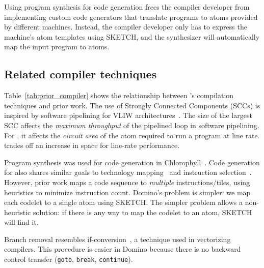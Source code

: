 Using program synthesis for code generation frees the compiler developer from implementing
custom code generators that translate \pktlanguage programs to atoms 
provided by different \absmachine machines.
Instead, the
compiler developer only has to express the \absmachine machine's
atom templates using SKETCH, and the synthesizer will automatically map 
the input \pktlanguage program to atoms.


\subsection{Related compiler techniques}
\label{ss:related_compiler}
Table~\ref{tab:prior_compiler} shows the relationship between \pktlanguage's
compilation techniques and prior work. The use of Strongly Connected Components
(SCCs) is inspired by software pipelining for VLIW
architectures~\cite{software_pipelining}. The size of the largest SCC affects
the {\em maximum throughput} of the pipelined loop in software pipelining. For
\pktlanguage, it affects the {\em circuit area} of the atom required to run a
program at line rate. \pktlanguage trades off an increase in space for
line-rate performance.

Program synthesis was used for code generation in
Chlorophyll~\cite{chlorophyll}.  Code generation for \pktlanguage also shares
similar goals to technology mapping~\cite{micheli} and
instruction selection~\cite{muchnik}.  However, prior work maps a code sequence
to \textit{multiple} instructions/tiles, using heuristics to minimize
instruction count. Domino's problem is simpler: we map each codelet to a single
atom using SKETCH.  The simpler problem allows a non-heuristic solution: if
there is any way to map the codelet to an atom, SKETCH will find it.

Branch removal resembles if-conversion~\cite{if_conversion}, a
technique used in vectorizing compilers. This procedure is easier in Domino
because there is no backward control transfer ({\tt goto}, {\tt break},
{\tt continue}).

